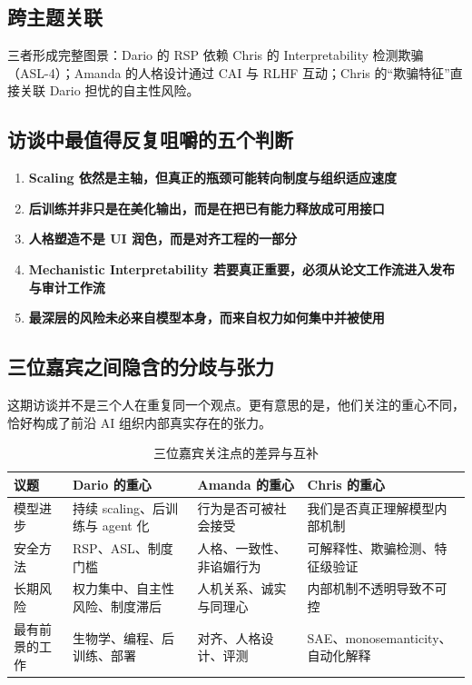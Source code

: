 \documentclass[a4paper]{article}
\begin{document}
\subsection{跨主题关联}

三者形成完整图景：Dario 的 RSP 依赖 Chris 的 Interpretability 检测欺骗（ASL-4）；Amanda 的人格设计通过 CAI 与 RLHF 互动；Chris 的``欺骗特征''直接关联 Dario 担忧的自主性风险。

\subsection{访谈中最值得反复咀嚼的五个判断}

\begin{enumerate}
    \item \textbf{Scaling 依然是主轴，但真正的瓶颈可能转向制度与组织适应速度}
    \item \textbf{后训练并非只是在美化输出，而是在把已有能力释放成可用接口}
    \item \textbf{人格塑造不是 UI 润色，而是对齐工程的一部分}
    \item \textbf{Mechanistic Interpretability 若要真正重要，必须从论文工作流进入发布与审计工作流}
    \item \textbf{最深层的风险未必来自模型本身，而来自权力如何集中并被使用}
\end{enumerate}

\subsection{三位嘉宾之间隐含的分歧与张力}

这期访谈并不是三个人在重复同一个观点。更有意思的是，他们关注的重心不同，恰好构成了前沿 AI 组织内部真实存在的张力。

\begin{table}[H]
\centering
\begin{tabular}{p{} p{} p{} p{}}
\toprule
议题 & Dario 的重心 & Amanda 的重心 & Chris 的重心 \\
\midrule
模型进步 & 持续 scaling、后训练与 agent 化 & 行为是否可被社会接受 & 我们是否真正理解模型内部机制 \\
安全方法 & RSP、ASL、制度门槛 & 人格、一致性、非谄媚行为 & 可解释性、欺骗检测、特征级验证 \\
长期风险 & 权力集中、自主性风险、制度滞后 & 人机关系、诚实与同理心 & 内部机制不透明导致不可控 \\
最有前景的工作 & 生物学、编程、后训练、部署 & 对齐、人格设计、评测 & SAE、monosemanticity、自动化解释 \\
\bottomrule
\end{tabular}
\caption{三位嘉宾关注点的差异与互补}
\end{table}
\end{document}
